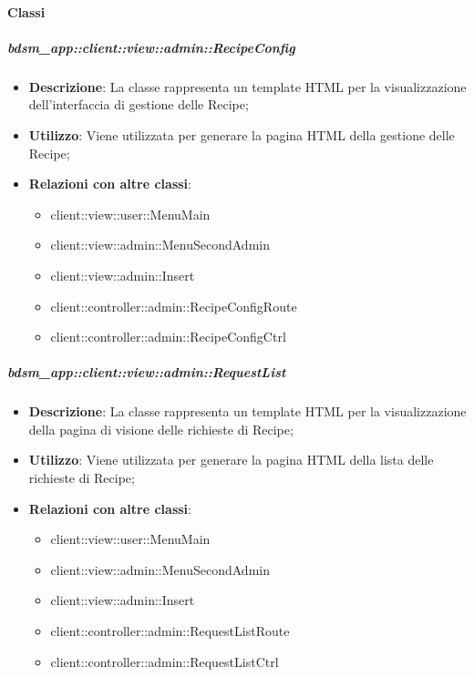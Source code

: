 	\paragraph{Classi} %
		\subparagraph{bdsm\_app::client::view::admin::RecipeConfig} %
		\label{subp:bdsm_app_client_view_admin_recipeconfig}
			\begin{itemize}
				\item \textbf{Descrizione}: La classe rappresenta un template HTML per la visualizzazione dell'interfaccia di gestione delle Recipe;
				\item \textbf{Utilizzo}: Viene utilizzata per generare la pagina HTML della gestione delle Recipe;
				\item \textbf{Relazioni con altre classi}:
					\begin{itemize}
						\item client::view::user::MenuMain
						\item client::view::admin::MenuSecondAdmin
						\item client::view::admin::Insert
						\item client::controller::admin::RecipeConfigRoute
						\item client::controller::admin::RecipeConfigCtrl
					\end{itemize}
			\end{itemize}

		\subparagraph{bdsm\_app::client::view::admin::RequestList} %
		\label{subp:bdsm_app_client_view_admin_requestlist}
			\begin{itemize}
				\item \textbf{Descrizione}: La classe rappresenta un template HTML per la visualizzazione della pagina di visione delle richieste di Recipe;
				\item \textbf{Utilizzo}: Viene utilizzata per generare la pagina HTML della lista delle richieste di Recipe;
				\item \textbf{Relazioni con altre classi}:
					\begin{itemize}
						\item client::view::user::MenuMain
						\item client::view::admin::MenuSecondAdmin
						\item client::view::admin::Insert
						\item client::controller::admin::RequestListRoute
						\item client::controller::admin::RequestListCtrl
					\end{itemize}
			\end{itemize}

